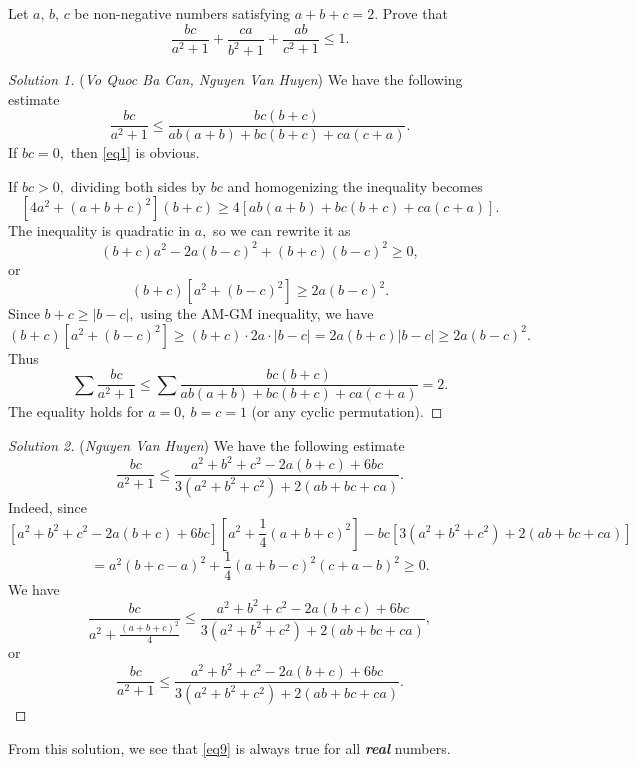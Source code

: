 \documentclass[12pt,a4paper]{book}
\begin{document}
\begin{pro_no_count}
Let $a,\,b,\,c$ be non-negative numbers satisfying $a+b+c=2.$ Prove that
\begin{equation}\label{eq9}
\frac{bc}{a^2+1} + \frac{ca}{b^2+1} + \frac{ab}{c^2+1} \le 1.
\end{equation}
\end{pro_no_count}

\begin{proof}[\cmss\problemColor Solution 1]
(\textit{Vo Quoc Ba Can, Nguyen Van Huyen}) We have the following estimate
\begin{equation}\label{eq1}
\frac{bc}{a^2+1} \le \frac{bc(b+c)}{ab(a+b)+bc(b+c)+ca(c+a)}.
\end{equation} 
If $bc = 0,$ then \eqref{eq1} is obvious.

If $bc >0,$ dividing both sides by $bc$ and homogenizing the inequality becomes
\[[4a^2+(a+b+c)^2](b+c) \geq  4[a b(a+b)+b c(b+c)+c a(c+a)].\]
The inequality is quadratic in $a,$ so we can rewrite it as
\[(b+c)a^2-2a(b-c)^2+(b+c)(b-c)^2 \ge 0,\]
or
\[(b+c)[a^2+(b-c)^2] \ge 2a(b-c)^2.\]
Since $b+c \ge |b-c|,$ using the AM-GM inequality, we have
\[(b+c)[a^2+(b-c)^2] \ge (b+c) \cdot  2a \cdot |b-c| = 2a(b+c)|b-c| \ge 2a(b-c)^2.\]
Thus
\[\sum \frac{bc}{a^2+1} \le \sum \frac{bc(b+c)}{ab(a+b)+bc(b+c)+ca(c+a)} = 2.\]
The equality holds for $a=0, \ b = c = 1$ (or any cyclic permutation).
\end{proof}

\begin{proof}[\cmss\problemColor Solution 2]
(\textit{Nguyen Van Huyen}) We have the following estimate
\[\frac{bc}{a^2+1} \leqslant \frac{a^2+b^2+c^2-2a(b+c)+6bc}{3(a^2+b^2+c^2)+2(ab+bc+ca)}.\]
Indeed, since
\[[a^2+b^2+c^2-2a(b+c)+6bc]\left[a^2+\frac{1}{4}(a+b+c)^2\right] - bc[3(a^2+b^2+c^2)+2(ab+bc+ca)]\]
\[=a^2(b+c-a)^2+\frac{1}{4}(a+b-c)^2(c+a-b)^2 \geqslant 0.\]
We have
\[\frac{bc}{a^2+\frac{(a+b+c)^2}{4}} \leqslant \frac{a^2+b^2+c^2-2a(b+c)+6bc}{3(a^2+b^2+c^2)+2(ab+bc+ca)},\]
or
\[\frac{bc}{a^2+1} \leqslant \frac{a^2+b^2+c^2-2a(b+c)+6bc}{3(a^2+b^2+c^2)+2(ab+bc+ca)}.\]
\end{proof}

\begin{note}
From this solution, we see that \eqref{eq9} is always true for all \textbf{\textit{real}} numbers.
\end{note}
\end{document}
